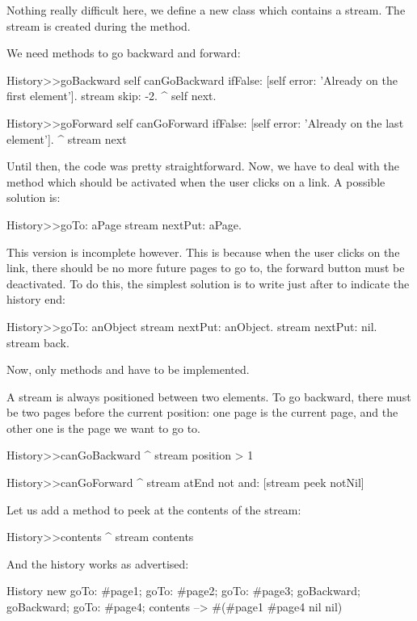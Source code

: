 \documentclass[a4paper,10pt,twoside]{book}
\begin{document}
Nothing really difficult here, we define a new class which contains a
stream. The stream is created during the  method.

We need methods to go backward and forward:

\begin{code}{}
History>>goBackward
  self canGoBackward ifFalse: [self error: 'Already on the first element'].
  stream skip: -2.
  ^ self next.

History>>goForward
  self canGoForward ifFalse: [self error: 'Already on the last element'].
  ^ stream next
\end{code}

Until then, the code was pretty straightforward. Now, we have to deal
with the  method which should be activated when the user
clicks on a link. A possible solution is:

\begin{code}{}
History>>goTo: aPage
    stream nextPut: aPage.
\end{code}

This version is incomplete however. This is because when the user
clicks on the link, there should be no more future pages to go to,
\ie the forward button must be deactivated. To do this, the simplest
solution is to write  just after to indicate the history end:

\begin{code}{}
History>>goTo: anObject
  stream nextPut: anObject.
  stream nextPut: nil.
  stream back.
\end{code}

Now, only methods  and  have to be
implemented.

A stream is always positioned between two elements. To go backward,
there must be two pages before the current position: one page is the
current page, and the other one is the page we want to go to.

\begin{code}{}
History>>canGoBackward
  ^ stream position > 1

History>>canGoForward
  ^ stream atEnd not and: [stream peek notNil]
\end{code}

Let us add a method to peek at the contents of the stream:
\begin{code}{}
History>>contents
  ^ stream contents
\end{code}

And the history works as advertised:
\begin{code}{}
History new
	goTo: #page1;
	goTo: #page2;
	goTo: #page3;
	goBackward;
	goBackward;
	goTo: #page4;
	contents --> #(#page1 #page4 nil nil)
\end{code}
\end{document}
